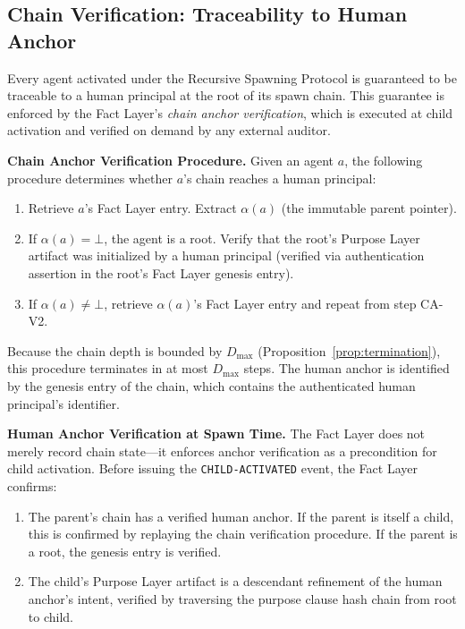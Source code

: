 \subsection{Chain Verification: Traceability to Human Anchor}

Every agent activated under the Recursive Spawning Protocol is guaranteed to be traceable to a human principal at the root of its spawn chain. This guarantee is enforced by the Fact Layer's \emph{chain anchor verification}, which is executed at child activation and verified on demand by any external auditor.

\medskip
\noindent\textbf{Chain Anchor Verification Procedure.} Given an agent $a$, the following procedure determines whether $a$'s chain reaches a human principal:

\begin{enumerate}
  \item[(CA-V1)] Retrieve $a$'s Fact Layer entry. Extract $\alpha(a)$ (the immutable parent pointer).
  \item[(CA-V2)] If $\alpha(a) = \bot$, the agent is a root. Verify that the root's Purpose Layer artifact was initialized by a human principal (verified via authentication assertion in the root's Fact Layer genesis entry).
  \item[(CA-V3)] If $\alpha(a) \neq \bot$, retrieve $\alpha(a)$'s Fact Layer entry and repeat from step CA-V2.
\end{enumerate}

Because the chain depth is bounded by $D_{\max}$ (Proposition~\ref{prop:termination}), this procedure terminates in at most $D_{\max}$ steps. The human anchor is identified by the genesis entry of the chain, which contains the authenticated human principal's identifier.

\medskip
\noindent\textbf{Human Anchor Verification at Spawn Time.} The Fact Layer does not merely record chain state—it enforces anchor verification as a precondition for child activation. Before issuing the \texttt{CHILD-ACTIVATED} event, the Fact Layer confirms:

\begin{enumerate}
  \item[(HAV-1)] The parent's chain has a verified human anchor. If the parent is itself a child, this is confirmed by replaying the chain verification procedure. If the parent is a root, the genesis entry is verified.
  \item[(HAV-2)] The child's Purpose Layer artifact is a descendant refinement of the human anchor's intent, verified by traversing the purpose clause hash chain from root to child.
\end{enumerate}


